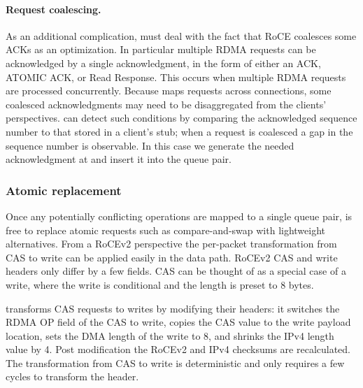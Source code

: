 \paragraph{Request coalescing.}

As an additional complication, {\sword} must deal with the fact
that RoCE coalesces some ACKs as an optimization.  In particular
multiple RDMA requests can be acknowledged by a single
acknowledgment, in the form of either an ACK, ATOMIC ACK, or Read
Response. This occurs when multiple RDMA requests are processed
concurrently.  Because {\sword} maps requests across connections, some
coalesced acknowledgments may need to be disaggregated from the
clients' perspectives.
%
{\sword} can detect such conditions by comparing the
acknowledged sequence number to that stored in a client's stub; when a
request is coalesced a gap in the sequence number is observable. In
this case we generate the needed acknowledgment at {\sword} and
insert it into the queue pair.



\subsubsection{Atomic replacement} 

Once any potentially conflicting operations are mapped to a single
queue pair, {\sword} is free to replace atomic requests such as
compare-and-swap with lightweight alternatives.  From a RoCEv2 perspective
the per-packet transformation from CAS to write can be applied easily
in the data path.  RoCEv2 CAS and write headers only differ by a few
fields. CAS can be thought of as a special case of a write, where the
write is conditional and the length is preset to 8 bytes.

{\sword} transforms CAS requests to writes by modifying their headers: it
switches the RDMA OP field of the CAS to write, copies the CAS
value to the write payload location, sets the DMA length of the write
to 8, and shrinks the IPv4 length value by 4.  Post modification the RoCEv2
and IPv4 checksums are recalculated.
The transformation from CAS to write
is deterministic and only requires a few cycles to transform the
header.


